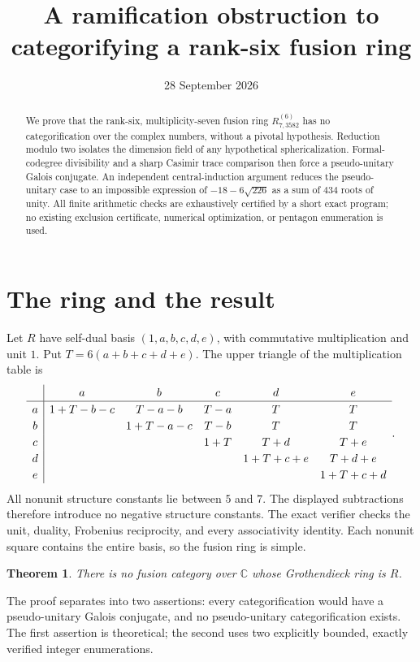 \documentclass[11pt]{article}
\title{A ramification obstruction to categorifying a rank-six fusion ring}
\author{}
\date{28 September 2026}
\newtheorem{theorem}{Theorem}[section]
\theoremstyle{remark}\newtheorem{remark}[theorem]{Remark}
\newcommand{\C}{\mathbb C}\newcommand{\Q}{\mathbb Q}\newcommand{\Z}{\mathbb Z}\newcommand{\F}{\mathbb F}
\begin{document}
\maketitle
\begin{abstract}
We prove that the rank-six, multiplicity-seven fusion ring $R^{(6)}_{7,3582}$ has no categorification over the complex numbers, without a pivotal hypothesis. Reduction modulo two isolates the dimension field of any hypothetical sphericalization. Formal-codegree divisibility and a sharp Casimir trace comparison then force a pseudo-unitary Galois conjugate. An independent central-induction argument reduces the pseudo-unitary case to an impossible expression of $-18-6\sqrt{226}$ as a sum of $434$ roots of unity. All finite arithmetic checks are exhaustively certified by a short exact program; no existing exclusion certificate, numerical optimization, or pentagon enumeration is used.
\end{abstract}
\tableofcontents

\section{The ring and the result}
Let $R$ have self-dual basis $(1,a,b,c,d,e)$, with commutative multiplication and unit $1$. Put $T=6(a+b+c+d+e)$. The upper triangle of the multiplication table is
\begin{equation}\label{eq:table}
\renewcommand{\arraystretch}{1.2}
\begin{array}{c|ccccc}
&a&b&c&d&e\\\hline
a&1+T-b-c&T-a-b&T-a&T&T\\
b&&1+T-a-c&T-b&T&T\\
c&&&1+T&T+d&T+e\\
d&&&&1+T+c+e&T+d+e\\
e&&&&&1+T+c+d
\end{array}.
\end{equation}
All nonunit structure constants lie between $5$ and $7$. The displayed subtractions therefore introduce no negative structure constants. The exact verifier checks the unit, duality, Frobenius reciprocity, and every associativity identity. Each nonunit square contains the entire basis, so the fusion ring is simple.

\begin{theorem}\label{thm:main}
There is no fusion category over $\C$ whose Grothendieck ring is $R$.
\end{theorem}
The proof separates into two assertions: every categorification would have a pseudo-unitary Galois conjugate, and no pseudo-unitary categorification exists. The first assertion is theoretical; the second uses two explicitly bounded, exactly verified integer enumerations.
\end{document}
